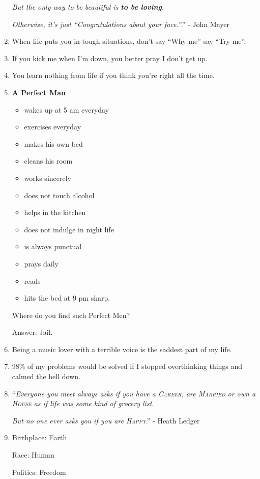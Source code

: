 \documentclass{article}
\begin{document}
\begin{enumerate}
	\textit{But the only way to be beautiful is \textbf{to be loving}}.
	
	\textit{Otherwise, it's just ``Congratulations about your face.''}.'' - John Mayer
	\item When life puts you in tough situations, don't say ``Why me'' say ``Try me''.
	\item If you kick me when I'm down, you better pray I don't get up.
	\item You learn nothing from life if you think you're right all the time.
	\item \textbf{A Perfect Man}
	\begin{itemize}
		\item wakes up at 5 am everyday
		\item exercises everyday
		\item makes his own bed
		\item cleans his room
		\item works sincerely
		\item does not touch alcohol
		\item helps in the kitchen
		\item does not indulge in night life
		\item is always punctual
		\item prays daily
		\item reads
		\item hits the bed at 9 pm sharp.
	\end{itemize}
	Where do you find such Perfect Men?
	
	Answer: Jail.
	\item Being a music lover with a terrible voice is the saddest part of my life.
	\item 98\% of my problems would be solved if I stopped overthinking things and calmed the hell down.
	\item ``\textit{Everyone you meet always asks if you have a \textsc{Career}, are \textsc{Married} or own a \textsc{House} as if life was some kind of grocery list}.
	
	\textit{But no one ever asks you if you are \textsc{Happy}}.'' - Heath Ledger
	\item Birthplace: Earth
	
	Race: Human
	
	Politics: Freedom
	

\end{enumerate}
\end{document}
